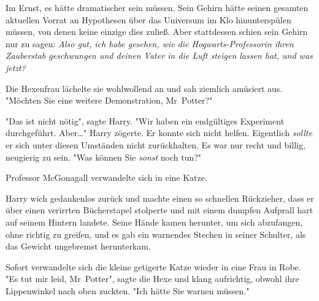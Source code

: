 Im Ernst, es hätte dramatischer sein müssen. Sein Gehirn hätte seinen gesamten aktuellen Vorrat an Hypothesen über das Universum im Klo hinunterspülen müssen, von denen keine einzige dies zuließ. Aber stattdessen schien sein Gehirn nur zu sagen: \emph{Also gut, ich habe gesehen, wie die Hogwarts-Professorin ihren Zauberstab geschwungen und deinen Vater in die Luft steigen lassen hat, und was jetzt?}

Die Hexenfrau lächelte sie wohlwollend an und sah ziemlich amüsiert aus. "Möchten Sie eine weitere Demonstration, Mr~Potter?"

"Das ist nicht nötig", sagte Harry. "Wir haben ein endgültiges Experiment durchgeführt. Aber…" Harry zögerte. Er konnte sich nicht helfen. Eigentlich \emph{sollte} er sich unter diesen Umständen nicht zurückhalten. Es war nur recht und billig, neugierig zu sein. "Was können Sie \emph{sonst} noch tun?"

Professor McGonagall verwandelte sich in eine Katze.

Harry wich gedankenlos zurück und machte einen so schnellen Rückzieher, dass er über einen verirrten Bücherstapel stolperte und mit einem dumpfen Aufprall hart auf seinem Hintern landete. Seine Hände kamen herunter, um sich abzufangen, ohne richtig zu greifen, und es gab ein warnendes Stechen in seiner Schulter, als das Gewicht ungebremst herunterkam.

Sofort verwandelte sich die kleine getigerte Katze wieder in eine Frau in Robe. "Es tut mir leid, Mr~Potter", sagte die Hexe und klang aufrichtig, obwohl ihre Lippenwinkel nach oben zuckten. "Ich hätte Sie warnen müssen."

